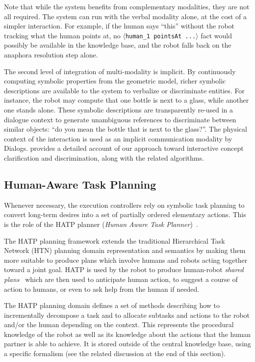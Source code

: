 \documentclass[preprint,3p,times]{elsarticle}
\newcommand{\stmt}[1]{{\footnotesize\tt$\langle$#1\relax$\rangle$}}
\begin{document}
Note that while the system benefits from complementary modalities, they are not
all required. The system can run with the verbal modality alone, at the cost of
a simpler interaction. For example, if the human says ``this'' without the robot
tracking what the human points at, no \stmt{human\_1 pointsAt ...} fact would
possibly be available in the knowledge base, and the robot falls back on the
anaphora resolution step alone.

The second level of integration of multi-modality is implicit. By continuously
computing symbolic properties from the geometric model, richer symbolic
descriptions are available to the system to verbalize or discriminate entities.
For instance, the robot may compute that one bottle is next to a glass, while
another one stands alone. These symbolic descriptions are transparently
re-used in a dialogue context to generate unambiguous references to discriminate
between similar objects: ``do you mean the bottle that is next to the glass?''.
The physical context of the interaction is used as an implicit communication
modality by {\sc Dialogs}. \cite{Ros2010b} provides a detailed account of our
approach toward interactive concept clarification and discrimination, along with the
related algorithms.


\subsection{Human-Aware Task Planning}
\label{hatp}

Whenever necessary, the execution controllers rely on symbolic task planning to convert long-term
desires into a set of partially ordered elementary actions. This is the role of the HATP
planner (\emph{Human Aware Task Planner})~\cite{Alili2008,
Alili2009,Lallement2014}.

The HATP planning framework extends the traditional Hierarchical Task
Network (HTN) planning domain representation and semantics by making them more
suitable to produce plans which involve humans and robots acting together
toward a joint goal. HATP is used by the robot to produce human-robot
\emph{shared plans}~\cite{Grosz1996,Clark1996,Kemp2007} which are then used to
anticipate human action, to suggest a course of action to humans, or even to ask
help from the human if needed.

The HATP planning domain defines a set of methods describing how to
incrementally decompose a task and to allocate subtasks and actions to the robot and/or the human depending on the context. This represents the procedural knowledge of the robot as well as
its knowledge about the actions that the human partner is able to achieve. It is
stored outside of the central knowledge base, using a specific formalism (see
the related discussion at the end of this section).
\end{document}
